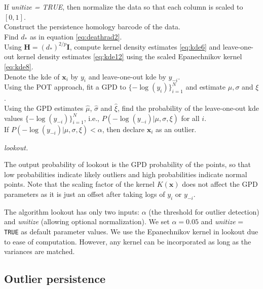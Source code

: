 \documentclass[12pt]{article}
\theoremstyle{definition}
\theoremstyle{definition}
\theoremstyle{definition}
\theoremstyle{definition}
\theoremstyle{remark}
\begin{document}
\DontPrintSemicolon
\begin{algorithm}\fontsize{11}{16}\selectfont
    If \textit{unitize = TRUE}, then normalize the data so that each column is scaled to $[0,1]$.\\
    Construct the persistence homology barcode of the data. \\
    Find $d_*$ as in equation \eqref{eq:deathrad2}. \\
    Using $\bm{H} = (d_*)^{2/p}\bm{I}$, compute kernel density estimates \eqref{eq:kde6} and leave-one-out kernel density estimates \eqref{eq:kde12} using the scaled Epanechnikov kernel \eqref{eq:kde8}. \\
    Denote the kde of $\bm{x}_i$ by $y_i$ and leave-one-out kde by $y_{-i}$.\\
    Using the POT approach, fit a GPD to $\{-\log(y_i)\}_{i=1}^N$ and estimate $\mu, \sigma$ and $\xi$. \\
    Using the GPD estimates $\hat\mu$, $\hat\sigma$ and $\hat\xi$, find the probability of the leave-one-out kde values $\{-\log(y_{-i})\}_{i=1}^N$, i.e., $P\left(-\log(y_{-i})|\mu, \sigma, \xi \right)$ for all $i$. \\
    If $P\left(-\log(y_{-i})|\mu, \sigma, \xi \right) < \alpha$, then declare $\bm{x}_i$ as an outlier.
    \caption{\itshape lookout.}
    \label{algo:lookout}
\end{algorithm}

The output probability of lookout is the GPD probability of the points, so that low probabilities indicate likely outliers and high probabilities indicate normal points. Note that the scaling factor of the kernel \(K(\bm{x})\) does not affect the GPD parameters as it is just an offset after taking logs of \(y_i\) or \(y_{-i}\).

The algorithm lookout has only two inputs: \(\alpha\) (the threshold for outlier detection) and \emph{unitize} (allowing optional normalization). We set \(\alpha= 0.05\) and \emph{unitize} = \texttt{TRUE} as default parameter values. We use the Epanechnikov kernel in lookout due to ease of computation. However, any kernel can be incorporated as long as the variances are matched.

\hypertarget{subsec:persistence}{%
\subsection{Outlier persistence}\label{subsec:persistence}}
\end{document}
